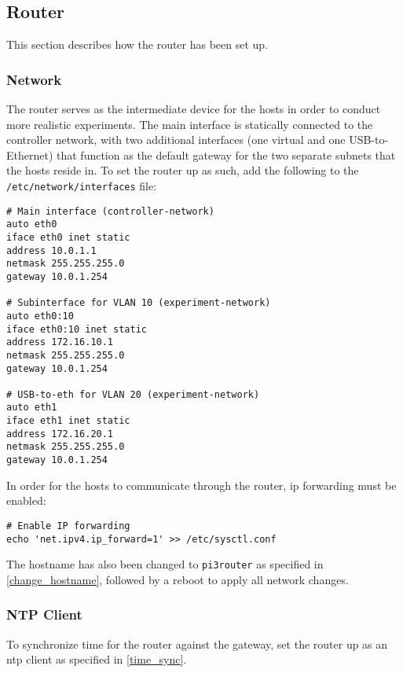\subsection{Router}

This section describes how the router has been set up.


\subsubsection{Network}

The router serves as the intermediate device for the hosts in order to conduct more realistic experiments. The main interface is statically connected to the controller network, with two additional interfaces (one virtual and one USB-to-Ethernet) that function as the default gateway for the two separate subnets that the hosts reside in. To set the router up as such, add the following to the \lstinline{/etc/network/interfaces} file:

\begin{verbatim}
# Main interface (controller-network)
auto eth0
iface eth0 inet static
address 10.0.1.1
netmask 255.255.255.0
gateway 10.0.1.254

# Subinterface for VLAN 10 (experiment-network)
auto eth0:10
iface eth0:10 inet static
address 172.16.10.1
netmask 255.255.255.0
gateway 10.0.1.254

# USB-to-eth for VLAN 20 (experiment-network)
auto eth1
iface eth1 inet static
address 172.16.20.1
netmask 255.255.255.0
gateway 10.0.1.254
\end{verbatim}

In order for the hosts to communicate through the router, \gls{ip} forwarding must be enabled:

\begin{verbatim}
# Enable IP forwarding
echo 'net.ipv4.ip_forward=1' >> /etc/sysctl.conf
\end{verbatim}

The hostname has also been changed to \lstinline{pi3router} as specified in \ref{change_hostname}, followed by a reboot to apply all network changes.


\subsubsection{NTP Client}

To synchronize time for the router against the gateway, set the router up as an \gls{ntp} client as specified in \ref{time_sync}.


